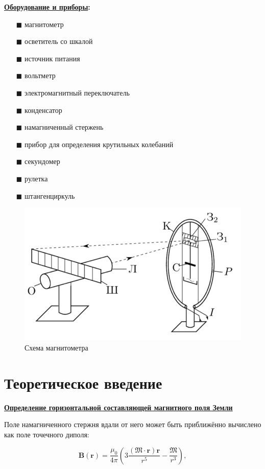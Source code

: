 \documentclass[a4paper,12pt]{article} %
\begin{document}
\textbf{\underline{Оборудование и приборы}:} 
\begin{center}
\begin{enumerate}
	\item[$\blacksquare$] магнитометр
	\item[$\blacksquare$] осветитель со шкалой
	\item[$\blacksquare$] источник питания
	\item[$\blacksquare$] вольтметр
	\item[$\blacksquare$] электромагнитный переключатель
	\item[$\blacksquare$] конденсатор
	\item[$\blacksquare$] намагниченный стержень
	\item[$\blacksquare$] прибор для определения крутильных колебаний
	\item[$\blacksquare$] секундомер
	\item[$\blacksquare$] рулетка
    \item[$\blacksquare$] штангенциркуль
\end{enumerate}
\end{center}
\begin{figure}[H]
	\centering
	\includegraphics[width = 8 cm]{res/magnitometer.png}
	\caption{Схема магнитометра}
	\label{fig:scheme}
\end{figure}
\section*{Теоретическое введение}

\textbf{\underline{Определение горизонтальной составляющей магнитного поля
	Земли}}

Поле намагниченного стержня вдали от него может быть приближённо
вычислено как поле точечного диполя:

\begin{equation}
	\textbf{B}\left(\textbf{r}\right)=\frac{\mu_0}{4\pi} \left( 3\frac{\left(\mathfrak{M}\cdot \textbf{r}\right)\textbf{r}}{r^5}-\frac{\mathfrak{M}}{r^3}\right),
	\label{eq:bio}
\end{equation}
\end{document}
